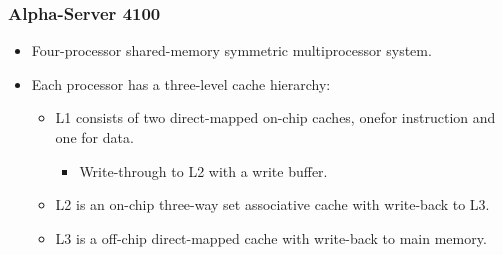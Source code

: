 \subsubsection{Alpha-Server 4100}
\begin{itemize}
\item Four-processor shared-memory symmetric multiprocessor
  system.
\item Each processor has a three-level cache hierarchy:
  \begin{itemize}
  \item L1 consists of two direct-mapped on-chip caches, onefor instruction and one for data.
    \begin{itemize}
    \item Write-through to L2 with a write buffer.
    \end{itemize}
  \item L2 is an on-chip three-way set associative cache with write-back to L3.
  \item L3 is a off-chip direct-mapped cache with write-back to main memory.
  \end{itemize}
\end{itemize}
